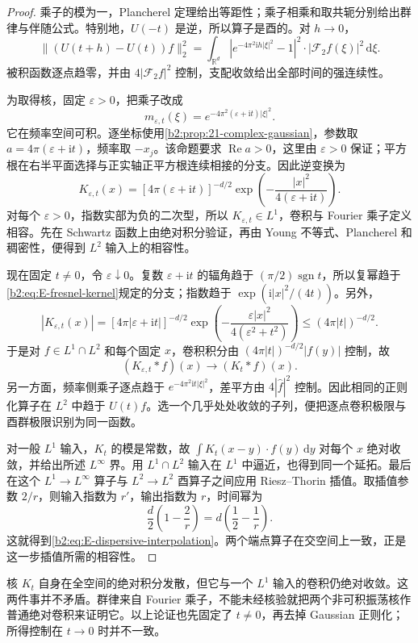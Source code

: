 \begin{proof}
乘子的模为一，Plancherel 定理给出等距性；乘子相乘和取共轭分别给出群律与伴随公式。特别地，\(U(-t)\) 是逆，所以算子是酉的。对 \(h\to0\)，
\[
 \|(U(t+h)-U(t))f\|_2^2
 =\int_{\mathbb R^d}
   |e^{-4\pi^2\mathrm ih|\xi|^2}-1|^2
        \cdot|\mathcal F_2f(\xi)|^2\,\mathrm d\xi.
\]
被积函数逐点趋零，并由 \(4|\mathcal F_2f|^2\) 控制，支配收敛给出全部时间的强连续性。

为取得核，固定 \(\varepsilon>0\)，把乘子改成
\[
 m_{\varepsilon,t}(\xi)
 =e^{-4\pi^2(\varepsilon+\mathrm it)|\xi|^2}.
\]
它在频率空间可积。逐坐标使用\cref{b2:prop:21-complex-gaussian}，参数取 \(a=4\pi(\varepsilon+\mathrm it)\)，频率取 \(-x_j\)。该命题要求 \(\operatorname{Re}a>0\)，这里由 \(\varepsilon>0\) 保证；平方根在右半平面选择与正实轴正平方根连续相接的分支。因此逆变换为
\begin{equation}\label{b2:eq:E-regularized-kernel}
 K_{\varepsilon,t}(x)
 =[4\pi(\varepsilon+\mathrm it)]^{-d/2}
       \exp\left(-\frac{|x|^2}{4(\varepsilon+\mathrm it)}\right).
\end{equation}
对每个 \(\varepsilon>0\)，指数实部为负的二次型，所以 \(K_{\varepsilon,t}\in L^1\)，卷积与 Fourier 乘子定义相容。先在 Schwartz 函数上由绝对积分验证，再由 Young 不等式、Plancherel 和稠密性，便得到 \(L^2\) 输入上的相容性。

现在固定 \(t\ne0\)，令 \(\varepsilon\downarrow0\)。复数 \(\varepsilon+\mathrm it\) 的辐角趋于 \((\pi/2)\operatorname{sgn}t\)，所以复幂趋于\eqref{b2:eq:E-fresnel-kernel}规定的分支；指数趋于 \(\exp(\mathrm i|x|^2/(4t))\)。另外，
\[
 |K_{\varepsilon,t}(x)|
 =[4\pi|\varepsilon+\mathrm it|]^{-d/2}
       \exp\left(-\frac{\varepsilon|x|^2}
                       {4(\varepsilon^2+t^2)}\right)
 \leq(4\pi|t|)^{-d/2}.
\]
于是对 \(f\in L^1\cap L^2\) 和每个固定 \(x\)，卷积积分由
\((4\pi|t|)^{-d/2}|f(y)|\) 控制，故
\[
 (K_{\varepsilon,t}*f)(x)\longrightarrow(K_t*f)(x).
\]
另一方面，频率侧乘子逐点趋于 \(e^{-4\pi^2\mathrm it|\xi|^2}\)，差平方由 \(4|\widehat f|^2\) 控制。因此相同的正则化算子在 \(L^2\) 中趋于 \(U(t)f\)。选一个几乎处处收敛的子列，便把逐点卷积极限与酉群极限识别为同一函数。

对一般 \(L^1\) 输入，\(K_t\) 的模是常数，故 \(\int K_t(x-y)\cdot f(y)\,\mathrm dy\) 对每个 \(x\) 绝对收敛，并给出所述 \(L^\infty\) 界。用 \(L^1\cap L^2\) 输入在 \(L^1\) 中逼近，也得到同一个延拓。最后在这个 \(L^1\to L^\infty\) 算子与 \(L^2\to L^2\) 酉算子之间应用 Riesz--Thorin 插值。取插值参数 \(2/r\)，则输入指数为 \(r'\)，输出指数为 \(r\)，时间幂为
\[
 \frac d2\left(1-\frac2r\right)
 =d\left(\frac12-\frac1r\right).
\]
这就得到\eqref{b2:eq:E-dispersive-interpolation}。两个端点算子在交空间上一致，正是这一步插值所需的相容性。
\end{proof}
核 \(K_t\) 自身在全空间的绝对积分发散，但它与一个 \(L^1\) 输入的卷积仍绝对收敛。这两件事并不矛盾。群律来自 Fourier 乘子，不能未经核验就把两个非可积振荡核作普通绝对卷积来证明它。以上论证也先固定了 \(t\ne0\)，再去掉 Gaussian 正则化；所得控制在 \(t\to0\) 时并不一致。

